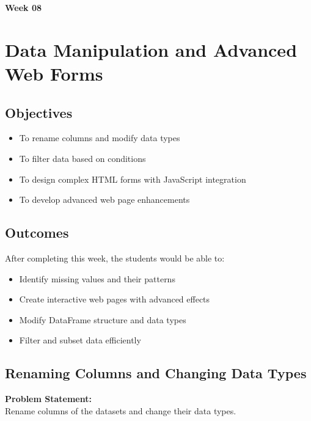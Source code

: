 \documentclass[a4paper,12pt]{article}
\begin{document}
\newpage
{}

\begin{center}
    \vspace*{1cm}
    {\Huge \textbf{Week 08}} \\
    \vspace{0.5cm}
    \vspace{1cm}
\end{center}

\section{Data Manipulation and Advanced Web Forms}

\subsection*{Objectives}
\begin{itemize}
    \item To rename columns and modify data types
    \item To filter data based on conditions
    \item To design complex HTML forms with JavaScript integration
    \item To develop advanced web page enhancements
\end{itemize}

\subsection*{Outcomes}
After completing this week, the students would be able to:
\begin{itemize}
    \item Identify missing values and their patterns
    \item Create interactive web pages with advanced effects
    \item Modify DataFrame structure and data types
    \item Filter and subset data efficiently
\end{itemize}

\subsection{Renaming Columns and Changing Data Types}
\textbf{Problem Statement:} \\
Rename columns of the datasets and change their data types.
\end{document}
